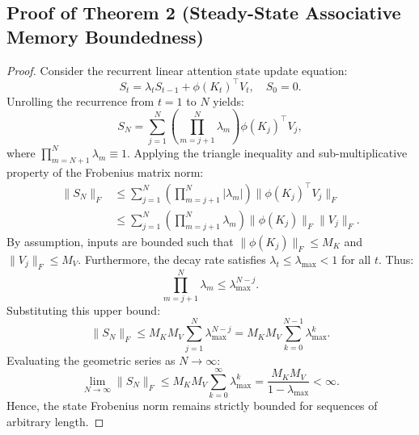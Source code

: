 \subsection{Proof of Theorem 2 (Steady-State Associative Memory Boundedness)}
\begin{proof}
Consider the recurrent linear attention state update equation:
\begin{equation}
S_t = \lambda_t S_{t-1} + \phi(K_t)^\top V_t, \quad S_0 = 0.
\end{equation}
Unrolling the recurrence from $t=1$ to $N$ yields:
\begin{equation}
S_N = \sum_{j=1}^N \left( \prod_{m=j+1}^N \lambda_m \right) \phi(K_j)^\top V_j,
\end{equation}
where $\prod_{m=N+1}^N \lambda_m \equiv 1$.
Applying the triangle inequality and sub-multiplicative property of the Frobenius matrix norm:
\begin{align}
\|S_N\|_F &\le \sum_{j=1}^N \left( \prod_{m=j+1}^N |\lambda_m| \right) \|\phi(K_j)^\top V_j\|_F \\
&\le \sum_{j=1}^N \left( \prod_{m=j+1}^N \lambda_m \right) \|\phi(K_j)\|_F \|V_j\|_F.
\end{align}
By assumption, inputs are bounded such that $\|\phi(K_j)\|_F \le M_K$ and $\|V_j\|_F \le M_V$. Furthermore, the decay rate satisfies $\lambda_t \le \lambda_{\max} < 1$ for all $t$. Thus:
\begin{equation}
\prod_{m=j+1}^N \lambda_m \le \lambda_{\max}^{N-j}.
\end{equation}
Substituting this upper bound:
\begin{equation}
\|S_N\|_F \le M_K M_V \sum_{j=1}^N \lambda_{\max}^{N-j} = M_K M_V \sum_{k=0}^{N-1} \lambda_{\max}^k.
\end{equation}
Evaluating the geometric series as $N \to \infty$:
\begin{equation}
\lim_{N \to \infty} \|S_N\|_F \le M_K M_V \sum_{k=0}^\infty \lambda_{\max}^k = \frac{M_K M_V}{1 - \lambda_{\max}} < \infty.
\end{equation}
Hence, the state Frobenius norm remains strictly bounded for sequences of arbitrary length.
\end{proof}

